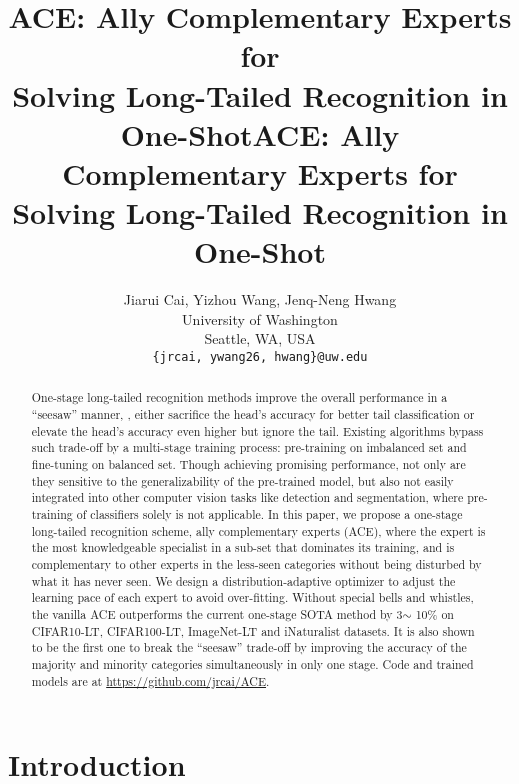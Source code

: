 \title{ACE: Ally Complementary Experts for\\
Solving Long-Tailed Recognition in One-Shot}



\title{ACE: Ally Complementary Experts for\\
Solving Long-Tailed Recognition in One-Shot}

\author{Jiarui Cai, Yizhou Wang, Jenq-Neng Hwang\\
University of Washington\\
Seattle, WA, USA\\
{\tt\small \{jrcai, ywang26, hwang\}@uw.edu}
}

\maketitle

\begin{abstract}
One-stage long-tailed recognition methods improve the overall performance in a ``seesaw'' manner, \ie, either sacrifice the head's accuracy for better tail classification or elevate the head's accuracy even higher but ignore the tail. Existing algorithms bypass such trade-off by a multi-stage training process: pre-training on imbalanced set and fine-tuning on balanced set. Though achieving promising performance, not only are they sensitive to the generalizability of the pre-trained model, but also not easily integrated into other computer vision tasks like detection and segmentation, where pre-training of classifiers solely is not applicable. In this paper, we propose a one-stage long-tailed recognition scheme,  ally complementary experts (ACE), where the expert is the most knowledgeable specialist in a sub-set that dominates its training, and is complementary to other experts in the less-seen categories without being disturbed by what it has never seen. We design a distribution-adaptive optimizer to adjust the learning pace of each expert to avoid over-fitting. Without special bells and whistles, the vanilla ACE outperforms the current one-stage SOTA method by 3$\sim$ 10$\%$ on CIFAR10-LT, CIFAR100-LT, ImageNet-LT and iNaturalist datasets. It is also shown to be the first one to break the ``seesaw'' trade-off by improving the accuracy of the majority and minority categories simultaneously in only one stage. Code and trained models are at \url{https://github.com/jrcai/ACE}. 
\end{abstract}

\section{Introduction}

